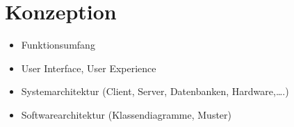 \section{Konzeption}
\begin{itemize}
    \item Funktionsumfang
    \item User Interface, User Experience
    \item Systemarchitektur (Client, Server, Datenbanken, Hardware,….)
    \item Softwarearchitektur (Klassendiagramme, Muster)
\end{itemize}
